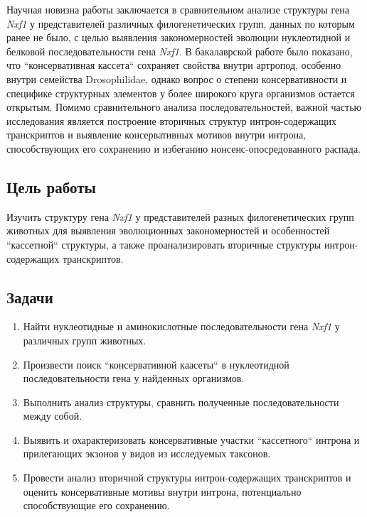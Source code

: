 Научная новизна работы заключается в сравнительном анализе структуры гена \textit{Nxf1} у представителей различных филогенетических групп, данных по которым ранее не было, с целью выявления закономерностей эволюции нуклеотидной и белковой последовательности гена \textit{Nxf1}.
В бакалаврской работе было показано, что ``консервативная кассета`` сохраняет свойства внутри артропод, особенно внутри семейства Drosophilidae, однако вопрос о степени консервативности и специфике структурных элементов у более широкого круга организмов остается открытым.
Помимо сравнительного анализа последовательностей, важной частью исследования является построение вторичных структур интрон-содержащих транскриптов и выявление консервативных мотивов внутри интрона, способствующих его сохранению и избеганию нонсенс-опосредованного распада.


\subsection{Цель работы}

Изучить структуру гена \textit{Nxf1} у представителей разных филогенетических групп животных для выявления эволюционных закономерностей и особенностей ``кассетной`` структуры, а также проанализировать вторичные структуры интрон-содержащих транскриптов.


\subsection{Задачи}

\begin{enumerate}[left=\parident]
  \item Найти нуклеотидные и аминокислотные последовательности гена \textit{Nxf1} у различных групп животных.
  \item Произвести поиск ``консервативной каасеты`` в нуклеотидной последовательности гена у найденных организмов.
  \item Выполнить анализ структуры, сравнить полученные последовательности между собой.
  \item Выявить и охарактеризовать консервативные участки ``кассетного`` интрона и прилегающих экзонов у видов из исследуемых таксонов.
  \item Провести анализ вторичной структуры интрон-содержащих транскриптов и оценить консервативные мотивы внутри интрона, потенциально способствующие его сохранению.
\end{enumerate}
